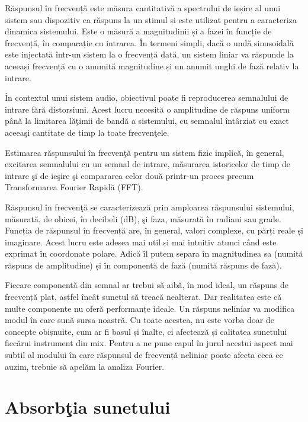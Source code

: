	Răspunsul în frecvență este măsura cantitativă a spectrului de ieșire al unui sistem sau dispozitiv ca răspuns la un stimul și este utilizat pentru a caracteriza dinamica sistemului. Este o măsură a magnitudinii și a fazei în funcție de frecvență, în comparație cu intrarea. În termeni simpli, dacă o undă sinusoidală este injectată într-un sistem la o frecvență dată, un sistem liniar va răspunde la aceeași frecvență cu o anumită magnitudine și un anumit unghi de fază relativ la intrare.	 
	
	\^{I}n contextul unui sistem audio, obiectivul poate fi reproducerea semnalului de intrare f\u{a}r\u{a} distorsiuni. Acest lucru necesit\u{a} o amplitudine de r\u{a}spuns uniform p\^{a}n\u{a} la limitarea l\u{a}\c{t}imii de band\u{a} a sistemului, cu semnalul \^{i}nt\^{a}rziat cu exact aceea\c{s}i cantitate de timp la toate frecven\c{t}ele.	 
	
	Estimarea r\u{a}spunsului \^{i}n frecven\c{t}\u{a} pentru un sistem fizic implic\u{a}, \^{i}n general, excitarea semnalului cu un semnal de intrare, m\u{a}surarea istoricelor de timp de intrare \c{s}i de ie\c{s}ire \c{s}i compararea celor dou\u{a} printr-un proces precum Transformarea Fourier Rapid\u{a} (FFT).
	
	R\u{a}spunsul \^{i}n frecven\c{t}\u{a} se caracterizeaz\u{a} prin amploarea r\u{a}spunsului sistemului, m\u{a}surat\u{a}, de obicei, \^{i}n decibeli (dB), \c{s}i faza, m\u{a}surat\u{a} \^{i}n radiani sau grade. Funcția de răspunsul în frecvență are, în general, valori complexe, cu părți reale și imaginare. Acest lucru este adesea mai util și mai intuitiv atunci când este exprimat în coordonate polare. Adică îl putem separa în magnitudinea sa (numită răspuns de amplitudine) și în componentă de fază (numită răspuns de fază).
	
	Fiecare componentă din semnal ar trebui să aibă, în mod ideal, un răspuns de frecvență plat, astfel încât sunetul să treacă nealterat. Dar realitatea este că multe componente nu oferă performanțe ideale. Un răspuns neliniar va modifica modul în care sună sursa noastră. Cu toate acestea, nu este vorba doar de concepte obișnuite, cum ar fi basul și înalte, ci afectează și calitatea sunetului fiecărui instrument din mix. Pentru a ne pune capul în jurul acestui aspect mai subtil al modului în care răspunsul de frecvență neliniar poate afecta ceea ce auzim, trebuie să apelăm la analiza Fourier.
	
	\section{Absorb\c{t}ia sunetului}
	
